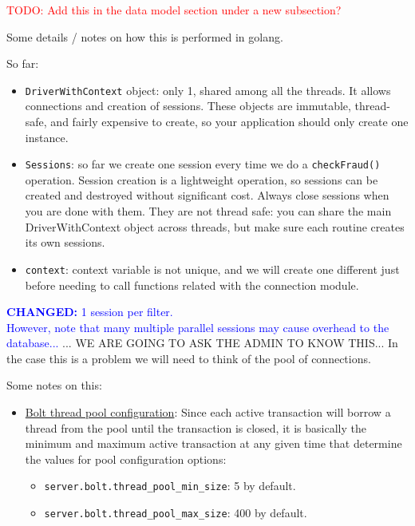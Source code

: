 \textcolor{red}{TODO: Add this in the data model section under a new subsection?}

Some details / notes on how this is performed in golang.


So far:
\begin{itemize}
  \item \texttt{DriverWithContext} object: only 1, shared among all the threads. It allows connections and creation of sessions. These objects are immutable, thread-safe, and fairly expensive to create, so your application should only create one instance.
  \item \texttt{Sessions}: so far we create one session every time we do a \texttt{checkFraud()} operation.
  Session creation is a lightweight operation, so sessions can be created and destroyed without significant cost. Always close sessions when you are done with them. They are not thread safe: you can share the main DriverWithContext object
  across threads, but make sure each routine creates its own sessions.
  \item \texttt{context}: context variable is not unique, and we will create one different just before needing to call functions related with the connection module.
\end{itemize}


\textcolor{blue}{\textbf{CHANGED:} 1 session per filter.\\
However, note that many multiple parallel sessions may cause overhead to the database...}
... WE ARE GOING TO ASK THE ADMIN TO KNOW THIS... In the case this is a problem we will need
to think of the pool of connections.


Some notes on this:

\begin{itemize}
  \item \href{https://neo4j.com/docs/operations-manual/current/performance/bolt-thread-pool-configuration/}{Bolt thread pool configuration}: Since each active transaction will borrow a thread from the pool until the transaction is closed, it is basically the minimum and maximum active transaction at any given time that determine the values for pool configuration options: 
  \begin{itemize}
    \item \texttt{server.bolt.thread\_pool\_min\_size}: 5 by default.
    \item \texttt{server.bolt.thread\_pool\_max\_size}: 400 by default.
  \end{itemize}
\end{itemize}

